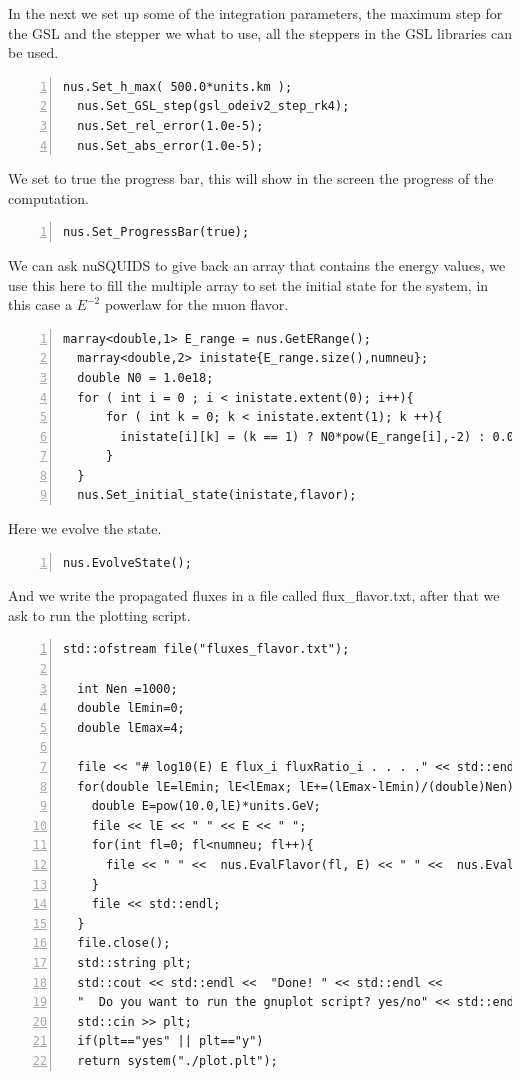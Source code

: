 In the next we set up some of the integration parameters, the maximum
step for the GSL and the stepper we what to use, all the steppers in
the GSL libraries can be used.
\begin{lstlisting}[frame=leftline, numbers = left,breaklines=true,label = ex:sin1,firstnumber=last]
  nus.Set_h_max( 500.0*units.km );
  nus.Set_GSL_step(gsl_odeiv2_step_rk4);
  nus.Set_rel_error(1.0e-5);
  nus.Set_abs_error(1.0e-5);
\end{lstlisting}
We set to true the progress bar, this will show in the screen the
progress of the computation.
\begin{lstlisting}[frame=leftline, numbers = left,breaklines=true,label = ex:sin1,firstnumber=last]
  nus.Set_ProgressBar(true);
\end{lstlisting}
We can ask nuSQUIDS to give back an array that contains the energy
values, we use this here to fill the multiple array to set the initial
state for the system, in this case a $E^{-2}$ powerlaw for the muon
flavor.
 
\begin{lstlisting}[frame=leftline, numbers = left,breaklines=true,label = ex:sin1,firstnumber=last]
  marray<double,1> E_range = nus.GetERange();
  marray<double,2> inistate{E_range.size(),numneu};
  double N0 = 1.0e18;
  for ( int i = 0 ; i < inistate.extent(0); i++){
      for ( int k = 0; k < inistate.extent(1); k ++){
        inistate[i][k] = (k == 1) ? N0*pow(E_range[i],-2) : 0.0;
      }
  }
  nus.Set_initial_state(inistate,flavor);
\end{lstlisting}
Here we evolve the state.
\begin{lstlisting}[frame=leftline, numbers = left,breaklines=true,label = ex:sin1,firstnumber=last]
  nus.EvolveState();
\end{lstlisting}
And we write the propagated fluxes in a file called {\ttf
  flux\_flavor.txt}, after that we ask to run the plotting script.
\begin{lstlisting}[frame=leftline, numbers = left,breaklines=true,label = ex:sin1,firstnumber=last]
  std::ofstream file("fluxes_flavor.txt");
  
  int Nen =1000;
  double lEmin=0;
  double lEmax=4;
  
  file << "# log10(E) E flux_i fluxRatio_i . . . ." << std::endl;
  for(double lE=lEmin; lE<lEmax; lE+=(lEmax-lEmin)/(double)Nen){
    double E=pow(10.0,lE)*units.GeV;
    file << lE << " " << E << " ";
    for(int fl=0; fl<numneu; fl++){
      file << " " <<  nus.EvalFlavor(fl, E) << " " <<  nus.EvalFlavor(fl, E)/(N0*pow(E,-2));
    }
    file << std::endl;
  }
  file.close();
  std::string plt;
  std::cout << std::endl <<  "Done! " << std::endl <<
  "  Do you want to run the gnuplot script? yes/no" << std::endl;
  std::cin >> plt;
  if(plt=="yes" || plt=="y")
  return system("./plot.plt");
\end{lstlisting}


